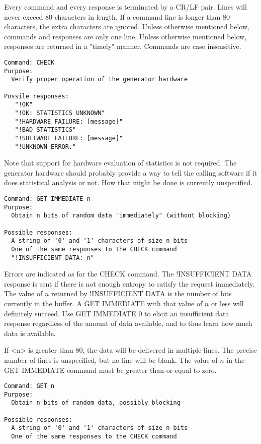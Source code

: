 Every command and every response is terminated by a CR/LF pair. Lines will never exceed 80
characters in length. If a command line is longer than 80 characters, the extra characters are
ignored. Unless otherwise mentioned below, commands and responses are only one line. Unless
otherwise mentioned below, responses are returned in a "timely" manner. Commands are case
insensitive.

\begin{verbatim}
Command: CHECK
Purpose:
  Verify proper operation of the generator hardware

Possile responses:
   "!OK"
   "!OK: STATISTICS UNKNOWN"
   "!HARDWARE FAILURE: [message]"
   "!BAD STATISTICS"
   "!SOFTWARE FAILURE: [message]"
   "!UNKNOWN ERROR."
\end{verbatim}

Note that support for hardware evaluation of statistics is not required. The generator hardware
should probably provide a way to tell the calling software if it does statistical analysis or
not. How that might be done is currently unspecified.

\begin{verbatim}
Command: GET IMMEDIATE n
Purpose:
  Obtain n bits of random data "immediately" (without blocking)

Possible responses:
  A string of '0' and '1' characters of size n bits
  One of the same responses to the CHECK command
  "!INSUFFICIENT DATA: n"
\end{verbatim}

Errors are indicated as for the CHECK command. The !INSUFFICIENT DATA response is sent if there
is not enough entropy to satisfy the request immediately. The value of $n$ returned by
!INSUFFICIENT DATA is the number of bits currently in the buffer. A GET IMMEDIATE with that
value of $n$ or less will definitely succeed. Use GET IMMEDIATE 0 to elicit an insufficient data
response regardless of the amount of data available, and to thus learn how much data is
available.

If <n> is greater than 80, the data will be delivered in multiple lines. The precise number of
lines is unspecified, but no line will be blank. The value of $n$ in the GET IMMEDIATE command
must be greater than or equal to zero.

\begin{verbatim}
Command: GET n
Purpose:
  Obtain n bits of random data, possibly blocking

Possible responses:
  A string of '0' and '1' characters of size n bits
  One of the same responses to the CHECK command
\end{verbatim}

